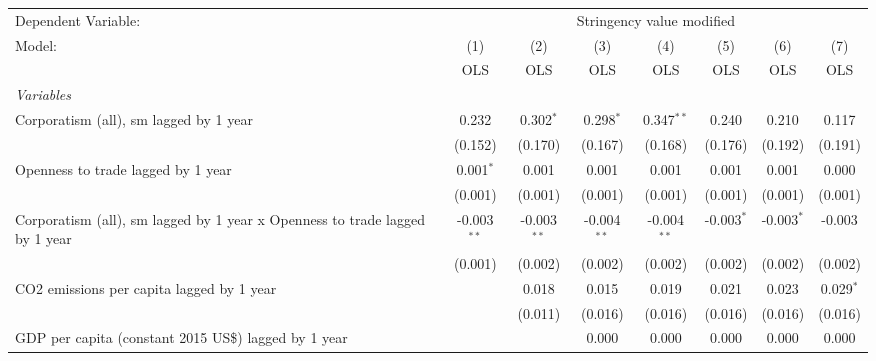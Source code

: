 
\begingroup
\centering
\begin{tabular}{lccccccc}
   \toprule
   Dependent Variable: & \multicolumn{7}{c}{Stringency value modified}\\
   Model:                                                                      & (1)           & (2)           & (3)           & (4)           & (5)          & (6)          & (7)\\  
                                                                               &  OLS          & OLS           & OLS           & OLS           & OLS          & OLS          & OLS\\  
   \midrule
   \emph{Variables}\\
   Corporatism (all), sm lagged by 1 year                                      & 0.232         & 0.302$^{*}$   & 0.298$^{*}$   & 0.347$^{**}$  & 0.240        & 0.210        & 0.117\\   
                                                                               & (0.152)       & (0.170)       & (0.167)       & (0.168)       & (0.176)      & (0.192)      & (0.191)\\   
   Openness to trade lagged by 1 year                                          & 0.001$^{*}$   & 0.001         & 0.001         & 0.001         & 0.001        & 0.001        & 0.000\\   
                                                                               & (0.001)       & (0.001)       & (0.001)       & (0.001)       & (0.001)      & (0.001)      & (0.001)\\   
   Corporatism (all), sm lagged by 1 year x Openness to trade lagged by 1 year & -0.003$^{**}$ & -0.003$^{**}$ & -0.004$^{**}$ & -0.004$^{**}$ & -0.003$^{*}$ & -0.003$^{*}$ & -0.003\\   
                                                                               & (0.001)       & (0.002)       & (0.002)       & (0.002)       & (0.002)      & (0.002)      & (0.002)\\   
   CO2 emissions per capita lagged by 1 year                                   &               & 0.018         & 0.015         & 0.019         & 0.021        & 0.023        & 0.029$^{*}$\\   
                                                                               &               & (0.011)       & (0.016)       & (0.016)       & (0.016)      & (0.016)      & (0.016)\\   
   GDP per capita (constant 2015 US\$) lagged by 1 year                        &               &               & 0.000         & 0.000         & 0.000        & 0.000        & 0.000\\   

\end{tabular}
